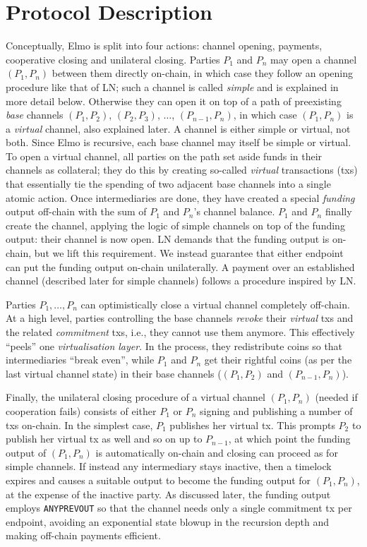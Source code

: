 \section{Protocol Description}
  Conceptually, Elmo is split into four actions: channel opening,
  payments, cooperative closing and unilateral closing. Parties $P_1$ and $P_n$
  may open a channel $(P_1, P_n)$ between them directly on-chain, in which case
  they follow an opening procedure like that of LN; such a channel is called
  \emph{simple} and is explained in more detail below.
  Otherwise they can open it on top of a path
  of preexisting \emph{base} channels $(P_1, P_2)$, $(P_2, P_3)$, $\dots$,
  $(P_{n-1}, P_{n})$, in which case $(P_1, P_n)$ is a \emph{virtual}
  channel, also explained later. A channel is either simple or virtual, not both. Since Elmo is
  recursive, each base channel may itself be simple or
  virtual. To open a virtual
  channel, all parties on the
  path set aside funds in their channels as
  collateral; they do this
  by creating so-called \emph{virtual} transactions (txs) that essentially
  tie the spending of two adjacent base channels into a single atomic action.
  Once intermediaries are done, they have created a special \emph{funding}
  output off-chain with the sum of $P_1$ and $P_n$'s channel
  balance. $P_1$ and $P_n$
  finally create the channel, applying the logic of simple channels on top of
  the funding output: their channel is now open. LN demands that the funding
  output is on-chain, but we lift this requirement. We instead guarantee that
  either endpoint can put the funding output on-chain unilaterally.
  A payment over an established channel (described later for simple channels) follows a procedure inspired by
  LN.

  Parties $P_1, \dots, P_n$ can optimistically close a virtual channel
  completely off-chain. At a high
  level, parties controlling the base channels \emph{revoke} their \emph{virtual}
  txs and the related \emph{commitment} txs, i.e., they cannot use them
  anymore. This effectively ``peels'' one \emph{virtualisation layer}.
  In the process, they redistribute coins so that intermediaries ``break even'',
  while $P_1$
  and $P_n$ get their rightful coins (as per the last virtual channel
  state) in their base channels ($(P_1, P_2)$ and $(P_{n-1}, P_n)$).

  Finally, the unilateral closing procedure of a virtual channel $(P_1, P_n)$
  (needed if cooperation fails)
  consists of either $P_1$ or $P_n$ signing and publishing a number of
  txs on-chain. In the simplest case, $P_1$ publishes her virtual tx. This
  prompts $P_2$ to publish her
  virtual tx as well and so on up to $P_{n-1}$, at which point the
  funding output of $(P_1, P_n)$ is automatically on-chain and closing can
  proceed as for simple channels. If instead any intermediary stays inactive, then a timelock
  expires and causes a suitable output to become the funding output for $(P_1,
  P_n)$, at
  the expense of the inactive party. As discussed later, the funding output
  employs \texttt{ANYPREVOUT} so that the channel needs only a
  single commitment tx per endpoint, avoiding an exponential state blowup in the
  recursion depth and making off-chain payments efficient.

